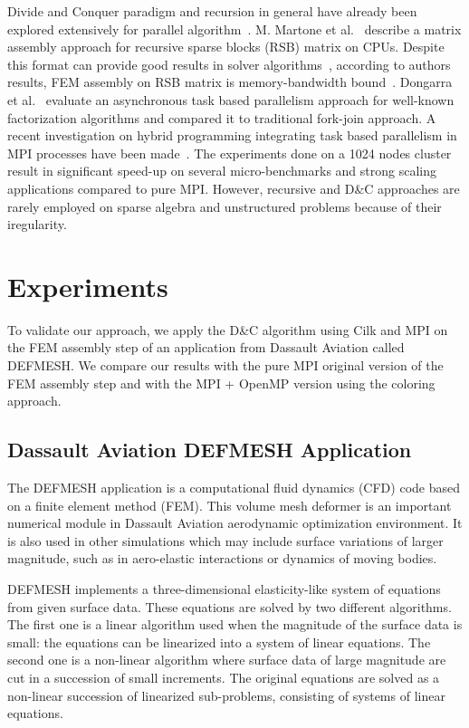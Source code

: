 \documentclass{IOS-Book-Article}
\begin{document}
Divide and Conquer paradigm and recursion in general have already been explored extensively for parallel algorithm~\cite{div}.
M. Martone et al.~\cite{RSBasm} describe a matrix assembly approach for recursive sparse blocks (RSB) matrix on CPUs.
Despite this format can provide good results in solver algorithms~\cite{RSBsolver}, according to authors results, FEM assembly on RSB matrix is memory-bandwidth bound~\cite{RSBasm}.
Dongarra et al.~\cite{Dongarra} evaluate an asynchronous task based parallelism approach for well-known factorization algorithms and compared it to traditional fork-join approach.
A recent investigation on hybrid programming integrating task based parallelism in MPI processes have been made~\cite{MPI_task}.
The experiments done on a 1024 nodes cluster result in significant speed-up on several micro-benchmarks and strong scaling applications compared to pure MPI. However, recursive and D\&C approaches are rarely employed on sparse algebra and unstructured problems because of their iregularity.

\section{Experiments}
To validate our approach, we apply the D\&C algorithm using Cilk and MPI on the FEM assembly step of an application from Dassault Aviation called DEFMESH.
We compare our results with the pure MPI original version of the FEM assembly step and with the MPI + OpenMP version using the coloring approach.

\subsection{Dassault Aviation DEFMESH Application}
The DEFMESH application is a computational fluid dynamics (CFD) code based on a finite element method (FEM).
This volume mesh deformer is an important numerical module in Dassault Aviation aerodynamic optimization environment.
It is also used in other simulations which may include surface variations of larger magnitude, such as in aero-elastic interactions or dynamics of moving bodies.

DEFMESH implements a three-dimensional elasticity-like system of equations from given surface data.
These equations are solved by two different algorithms.
The first one is a linear algorithm used when the magnitude of the surface data is small: the equations can be linearized into a system of linear equations.
The second one is a non-linear algorithm where surface data of large magnitude are cut in a succession of small increments.
The original equations are solved as a non-linear succession of linearized sub-problems, consisting of systems of linear equations.
 
\end{document}
